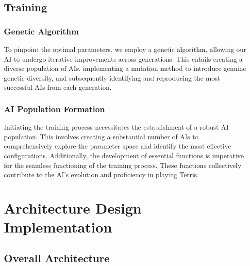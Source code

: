 \documentclass[conference]{IEEEtran}
\begin{document}
\subsection{Training}
\subsubsection{Genetic Algorithm}
To pinpoint the optimal parameters, we employ a genetic algorithm, allowing our AI to undergo iterative improvements across generations. This entails creating a diverse population of AIs, implementing a mutation method to introduce genuine genetic diversity, and subsequently identifying and reproducing the most successful AIs from each generation.

\subsubsection{AI Population Formation}
Initiating the training process necessitates the establishment of a robust AI population. This involves creating a substantial number of AIs to comprehensively explore the parameter space and identify the most effective configurations. Additionally, the development of essential functions is imperative for the seamless functioning of the training process. These functions collectively contribute to the AI's evolution and proficiency in playing Tetris.




\clearpage
\section{Architecture Design Implementation}
\subsection{Overall Architecture}
\end{document}
